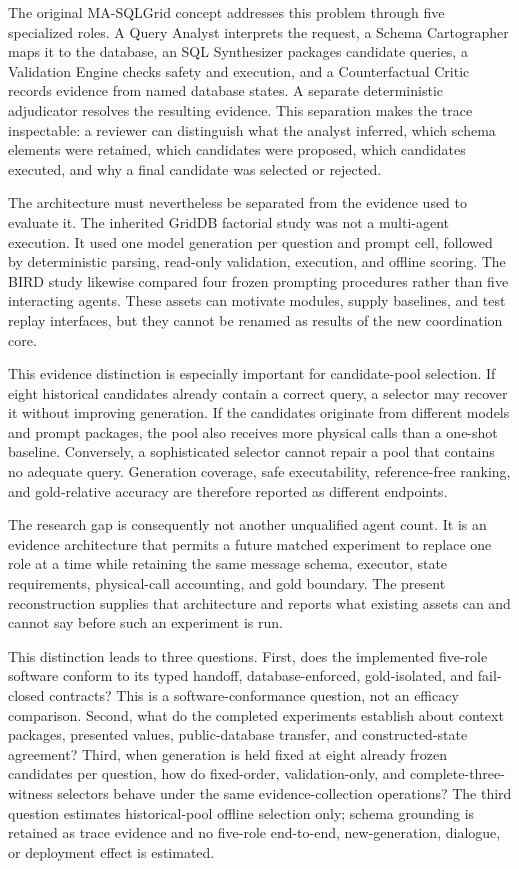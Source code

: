 \documentclass[applsci,article,submit,moreauthors]{Definitions/mdpi}
\newcommand{\masql}{MA-SQLGrid}
\begin{document}
The original \masql{} concept addresses this problem through five specialized roles. A Query Analyst interprets the request, a Schema Cartographer maps it to the database, an SQL Synthesizer packages candidate queries, a Validation Engine checks safety and execution, and a Counterfactual Critic records evidence from named database states. A separate deterministic adjudicator resolves the resulting evidence. This separation makes the trace inspectable: a reviewer can distinguish what the analyst inferred, which schema elements were retained, which candidates were proposed, which candidates executed, and why a final candidate was selected or rejected.

The architecture must nevertheless be separated from the evidence used to evaluate it. The inherited GridDB factorial study was not a multi-agent execution. It used one model generation per question and prompt cell, followed by deterministic parsing, read-only validation, execution, and offline scoring. The BIRD study likewise compared four frozen prompting procedures rather than five interacting agents. These assets can motivate modules, supply baselines, and test replay interfaces, but they cannot be renamed as results of the new coordination core.

This evidence distinction is especially important for candidate-pool selection. If eight historical candidates already contain a correct query, a selector may recover it without improving generation. If the candidates originate from different models and prompt packages, the pool also receives more physical calls than a one-shot baseline. Conversely, a sophisticated selector cannot repair a pool that contains no adequate query. Generation coverage, safe executability, reference-free ranking, and gold-relative accuracy are therefore reported as different endpoints.

The research gap is consequently not another unqualified agent count. It is an evidence architecture that permits a future matched experiment to replace one role at a time while retaining the same message schema, executor, state requirements, physical-call accounting, and gold boundary. The present reconstruction supplies that architecture and reports what existing assets can and cannot say before such an experiment is run.

This distinction leads to three questions. First, does the implemented five-role software conform to its typed handoff, database-enforced, gold-isolated, and fail-closed contracts? This is a software-conformance question, not an efficacy comparison. Second, what do the completed experiments establish about context packages, presented values, public-database transfer, and constructed-state agreement? Third, when generation is held fixed at eight already frozen candidates per question, how do fixed-order, validation-only, and complete-three-witness selectors behave under the same evidence-collection operations? The third question estimates historical-pool offline selection only; schema grounding is retained as trace evidence and no five-role end-to-end, new-generation, dialogue, or deployment effect is estimated.
\end{document}
